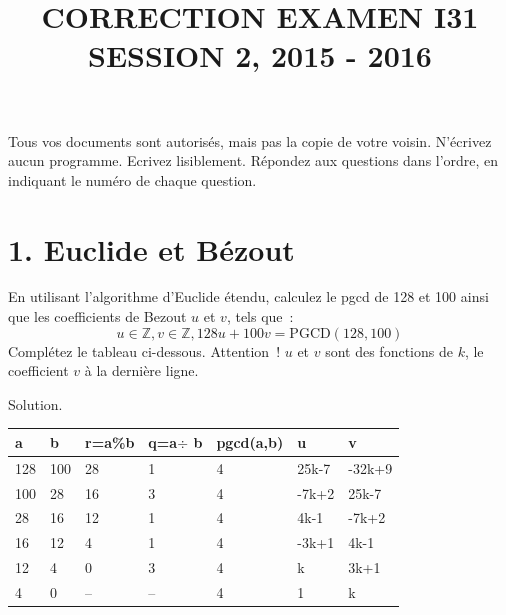\documentclass[11pt]{article}
\def\Z{\mathbb Z}
\begin{document}
\title{ CORRECTION EXAMEN I31 SESSION 2, 2015 - 2016}
\date{}\maketitle

Tous vos documents sont autorisés, mais pas la copie de votre voisin.
N’écrivez aucun programme. Ecrivez lisiblement. Répondez aux questions
dans l’ordre, en indiquant le numéro de chaque question.

{
\section*{1. Euclide et Bézout}

En utilisant l'algorithme d'Euclide étendu, calculez le pgcd de 128 et 100 ainsi que les coefficients de Bezout $u$ et $v$, tels que~:
$$u\in \Z, v\in \Z, 128u + 100 v=\mbox{PGCD}(128, 100)$$
Complétez le tableau ci-dessous. Attention~! $u$ et $v$ sont des fonctions 
de $k$, le coefficient $v$  à la dernière ligne. 


Solution.

\begin{tabular}{|p{1.5cm}|p{1.5cm}|p{1.5cm}|p{1.5cm}|p{1.5cm}|p{1.5cm}|p{1.5cm}|}
\hline a & b & r=a\%b & q=a$\div$ b & pgcd(a,b) & u & v\\
\hline
\hline
128   &  100   & 28    & 1    & 4   & 25k-7  & -32k+9 \\
\hline
100 & 28   & 16  & 3 & 4  & -7k+2 &  25k-7 \\
\hline
28 & 16   & 12  & 1 & 4  & 4k-1  & -7k+2 \\
\hline
16 &  12  &  4 &  1  & 4 &  -3k+1 & 4k-1  \\
\hline
12 &  4  & 0   & 3   & 4  &  k & 3k+1  \\
\hline
4 &  0  & --   & --   & 4  &  1 & k   \\
\hline
\end{tabular}
}
\end{document}
